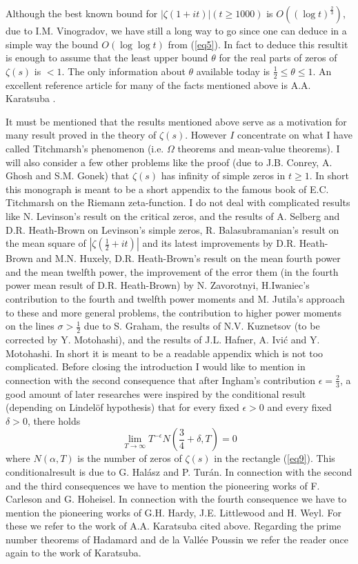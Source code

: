 \begin{remark}%
Although the best known bound for $|\zeta(1+it)| (t \geq 1000)$ is $O((\log t)^{\frac{2}{3}})$, due to I.M. Vinogradov, we have still a long way to go since one can deduce in a simple way the bound $O(\log \log t)$ from (\ref{eq5}). In fact to deduce this result\pageoriginale it is enough to assume that the least upper bound $\theta$ for the real parts of zeros of $\zeta(s)$ is $<1$. The only information about $\theta$ available today is $\frac{1}{2} \leq \theta \leq 1$. An excellent reference article for many of the facts mentioned above is A.A. Karatsuba \cite{Karatsuba1}.

It must be mentioned that the results mentioned above serve as a motivation for many result proved in the theory of $\zeta(s)$. However $I$ concentrate on what I have called Titchmarsh's phenomenon (i.e. $\Omega$ theorems and mean-value theorems). I will also consider a few other problems like the proof (due to J.B. Conrey, A. Ghosh and S.M. Gonek) that $\zeta(s)$ has infinity of simple zeros in $t \geq 1$. In short this monograph is meant to be a short appendix to the famous book of E.C. Titchmarsh on the Riemann zeta-function. I do not deal with complicated results like N. Levinson's result on the critical  zeros, and the results of A. Selberg and D.R. Heath-Brown on Levinson's simple zeros, R. Balasubramanian's result on the mean square of $|\zeta (\frac{1}{2} + it)|$ and its latest improvements by D.R. Heath-Brown and M.N. Huxely, D.R. Heath-Brown's result on the mean fourth power and the mean twelfth power, the improvement of the error them (in the fourth power mean result of D.R. Heath-Brown) by N. Zavorotnyi, H.Iwaniec's contribution to the fourth and twelfth power moments and M. Jutila's approach to these and more general problems, the contribution to higher power moments on the lines $\sigma > \frac{1}{2}$ due to S. Graham, the results of N.V. Kuznetsov (to be corrected by Y. Motohashi), and the results of J.L. Hafner, A. Ivi\'c and Y. Motohashi. In short it is meant to be a readable appendix which is not too complicated. Before closing the introduction I would like to mention in connection with the second consequence that after Ingham's contribution $\epsilon = \frac{2}{3}$, a good amount of later researches were inspired by the conditional result (depending on Lindel\"of hypothesis) that for every fixed $\epsilon > 0$ and every fixed $\delta > 0$, there holds 
$$
\lim\limits_{T \to \infty} T^{-\epsilon} N \left(\frac{3}{4} + \delta, T \right) = 0
$$
where $N(\alpha, T)$ is the number of zeros of $\zeta(s)$ in the rectangle (\ref{eq9}). This conditional\pageoriginale result is due to G. Hal\'asz and P. Tur\'an. In connection with the second and the third consequences we have to mention the pioneering works of F. Carleson and G. Hoheisel. In connection with the fourth  consequence we have to mention the pioneering works of G.H. Hardy, J.E. Littlewood and H. Weyl. For these we refer to the work of A.A. Karatsuba cited above. Regarding the prime number theorems of Hadamard and de la Vall\'ee Poussin we refer the reader once again to the work of Karatsuba.
\end{remark}

